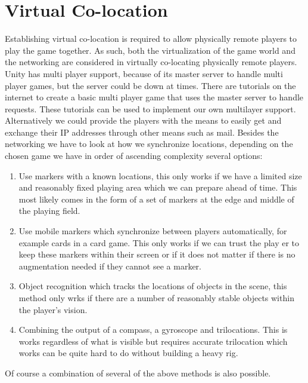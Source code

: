 \section{Virtual Co-location} \label{sec:virtualcolocation}
	Establishing virtual co-location is required to allow physically remote players
	to play the game together. As such, both the virtualization of the game world and
	the networking are considered in virtually co-locating physically remote players.
	Unity has multi player support, because of its master server to handle multi player
	games, but the server could be down at times. There are tutorials on the internet
	to create a basic multi player game that uses the master server to handle requests.
	These tutorials can be used to implement our own multilayer support. Alternatively
	we could provide the players with the means to easily get and exchange their IP
	addresses through other means such as mail.
	Besides the networking we have to look at how we synchronize locations, depending on
	the chosen game we have in order of ascending complexity several options:

	\begin{enumerate}
		\item Use markers with a known locations, this only works if we have a limited size
		      and reasonably fixed playing area which we can prepare ahead of time. This most
					likely comes in the form of a set of markers at the edge and middle of the playing
					field.
		\item Use mobile markers which synchronize between players automatically, for example
		      cards in a card game. This only works if we can trust the play er to keep these markers
					within their screen or if it does not matter if there is no augmentation needed if they
					cannot see a marker.
		\item Object recognition which tracks the locations of objects in the scene,
		      this method only wrks if there are a number of reasonably stable objects
					within the player's vision.
		\item Combining the output of a compass, a gyroscope and trilocations. This is
		      works regardless of what is visible but requires accurate trilocation which works
					can be quite hard to do without building a heavy rig.
	\end{enumerate}
	Of course a combination of several of the above methods is also possible.


